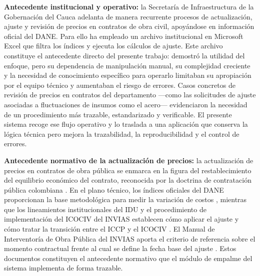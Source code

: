 \documentclass[12pt,letterpaper]{article}
\providecommand{\parencite}{\citep}
\newcommand{\ICOCIV}{ICOCIV}
\newcommand{\ICCP}{ICCP}
\newcommand{\DANE}{DANE}
\newcommand{\IDU}{IDU}
\newcommand{\INVIAS}{INVIAS}
\begin{document}
\textbf{Antecedente institucional y operativo:} la Secretaría de Infraestructura de la Gobernación del Cauca adelanta de manera recurrente procesos de actualización, ajuste y revisión de precios en contratos de obra civil, apoyándose en información oficial del \DANE. Para ello ha empleado un archivo institucional en Microsoft Excel que filtra los índices y ejecuta los cálculos de ajuste. Este archivo constituye el antecedente directo del presente trabajo: demostró la utilidad del enfoque, pero su dependencia de manipulación manual, su complejidad creciente y la necesidad de conocimiento específico para operarlo limitaban su apropiación por el equipo técnico y aumentaban el riesgo de errores. Casos concretos de revisión de precios en contratos del departamento ---como las solicitudes de ajuste asociadas a fluctuaciones de insumos como el acero--- evidenciaron la necesidad de un procedimiento más trazable, estandarizado y verificable. El presente sistema recoge ese flujo operativo y lo traslada a una aplicación que conserva la lógica técnica pero mejora la trazabilidad, la reproducibilidad y el control de errores.

\textbf{Antecedente normativo de la actualización de precios:} la actualización de precios en contratos de obra pública se enmarca en la figura del restablecimiento del equilibrio económico del contrato, reconocida por la doctrina de contratación pública colombiana \parencite{cce2024_equilibrio}. En el plano técnico, los índices oficiales del \DANE{} proporcionan la base metodológica para medir la variación de costos \parencite{dane_ficha_icociv,dane_metodologia_icociv}, mientras que los lineamientos institucionales del \IDU{} y el procedimiento de implementación del \ICOCIV{} del \INVIAS{} establecen cómo aplicar el ajuste y cómo tratar la transición entre el \ICCP{} y el \ICOCIV{} \parencite{idu_circular_6_2022,invias2022_icociv}. El Manual de Interventoría de Obra Pública del \INVIAS{} aporta el criterio de referencia sobre el momento contractual frente al cual se define la fecha base del ajuste \parencite{invias2010_interventoria}. Estos documentos constituyen el antecedente normativo que el módulo de empalme del sistema implementa de forma trazable.
\end{document}
